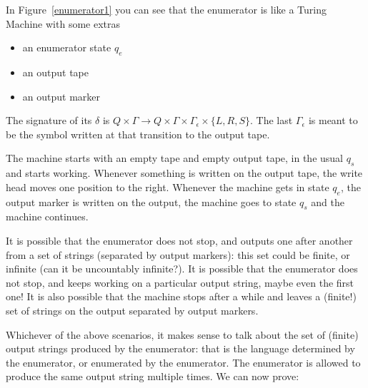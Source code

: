 In Figure~\ref{enumerator1} you can see that the enumerator is like a
Turing Machine with some extras
\begin{itemize}
\item an enumerator state $q_e$
\item an output tape
\item an output marker
\end{itemize}
The signature of its $\delta$ is
%
$Q \times \Gamma \rightarrow Q \times \Gamma \times \Gamma_\epsilon \times \{L,R,S\}$.
The last $\Gamma_\epsilon$ is meant to be the symbol written at that
transition to the output tape.


The machine starts with an empty tape and empty output tape, in the
usual $q_s$ and starts working. Whenever something is written on the
output tape, the write head moves one position to the right. Whenever
the machine gets in state $q_e$, the output marker is written on the
output, the machine goes to state $q_s$ and the machine continues.

It is possible that the enumerator does not stop, and outputs one
after another from a set of strings (separated by output markers):
this set could be finite, or infinite (can it be uncountably
infinite?). It is possible that the enumerator does not stop, and
keeps working on a particular output string, maybe even the first one!
It is also possible that the machine stops after a while and leaves a (finite!) set of strings on
the output separated by output markers.

Whichever of the above scenarios, it makes sense to talk about the set
of (finite) output strings produced by the enumerator: that is the
language determined by the enumerator, or enumerated by the
enumerator. The enumerator is allowed to produce the same output
string multiple times. We can now prove:

